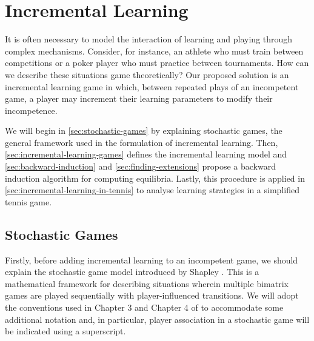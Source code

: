
\chapter{Incremental Learning}  \label{chp:incremental-learning}
    It is often necessary to model the interaction of learning and playing through complex mechanisms.
    Consider, for instance, an athlete who must train between competitions or a poker player who must practice between tournaments.
    How can we describe these situations game theoretically?
    Our proposed solution is an incremental learning game in which, between repeated plays of an incompetent game, a player may increment their learning parameters to modify their incompetence.

    We will begin in \autoref{sec:stochastic-games} by explaining stochastic games, the general framework used in the formulation of incremental learning.
    Then, \autoref{sec:incremental-learning-games} defines the incremental learning model and \autoref{sec:backward-induction} and \autoref{sec:finding-extensions} propose a backward induction algorithm for computing equilibria.
    Lastly, this procedure is applied in \autoref{sec:incremental-learning-in-tennis} to analyse learning strategies in a simplified tennis game.



\section{Stochastic Games} \label{sec:stochastic-games}
    Firstly, before adding incremental learning to an incompetent game, we should explain the stochastic game model introduced by Shapley \parencite{Shapley1953}.
    This is a mathematical framework for describing situations wherein multiple bimatrix games are played sequentially with player-influenced transitions.
    We will adopt the conventions used in Chapter 3 and Chapter 4 of \parencite{Filar1997} to accommodate some additional notation and, in particular, player association in a stochastic game will be indicated using a superscript.

